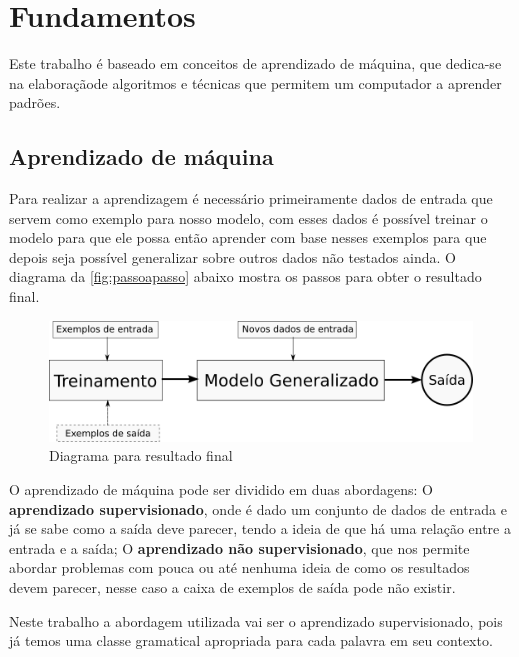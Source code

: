 \chapter{Fundamentos}\label{fundamentos}

Este trabalho é baseado em conceitos de aprendizado de máquina, que dedica-se na elaboraçãode algoritmos e técnicas que permitem um computador a aprender padrões.  

\section{Aprendizado de máquina}\label{sec:aprendizadodemaquina}

Para realizar a aprendizagem é necessário primeiramente dados de entrada que servem como exemplo para nosso modelo, com esses dados é possível treinar o modelo para que ele possa então aprender com base nesses exemplos para que depois seja possível generalizar sobre outros dados não testados ainda. O diagrama da \autoref{fig:passoapasso} abaixo mostra os passos para obter o resultado final.

\begin{figure}[htb]
	  \caption{Diagrama para resultado final}\label{fig:passoapasso}
	  \begin{center}
	      \includegraphics[scale=0.5]{img/passoapasso}
	  \end{center}
\end{figure}


O aprendizado de máquina pode ser dividido em duas abordagens: O \textbf{aprendizado supervisionado}, onde é dado um conjunto de dados de entrada e já se sabe como a saída deve parecer, tendo a ideia de que há uma relação entre a entrada e a saída; O \textbf{aprendizado não supervisionado}, que nos permite abordar problemas com pouca ou até nenhuma ideia de como os resultados devem parecer, nesse caso a caixa de exemplos de saída pode não existir.

Neste trabalho a abordagem utilizada vai ser o aprendizado supervisionado, pois já temos uma classe gramatical apropriada para cada palavra em seu contexto.

